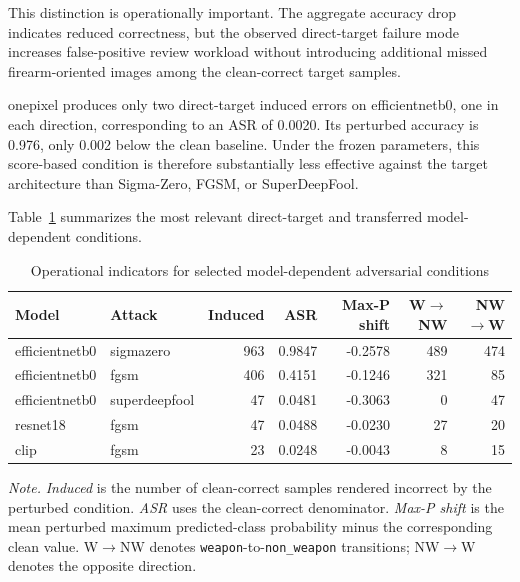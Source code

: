 This distinction is operationally important. The aggregate accuracy drop
indicates reduced correctness, but the observed direct-target failure mode
increases false-positive review workload without introducing additional missed
firearm-oriented images among the clean-correct target samples.

\gls{onepixel} produces only two direct-target induced errors on
\gls{efficientnetb0}, one in each direction, corresponding to an ASR of 0.0020.
Its perturbed accuracy is 0.976, only 0.002 below the clean baseline. Under the
frozen parameters, this score-based condition is therefore substantially less
effective against the target architecture than Sigma-Zero, FGSM, or
SuperDeepFool.

Table~\ref{tab:results-adversarial-operational-errors} summarizes the most
relevant direct-target and transferred model-dependent conditions.

\begin{table}[H]
\centering
\scriptsize
\setlength{\tabcolsep}{3.5pt}
\renewcommand{\arraystretch}{1.15}
\caption{Operational indicators for selected model-dependent adversarial
conditions}
\label{tab:results-adversarial-operational-errors}
\begin{tabular}{@{}l l r r r r r@{}}
\toprule
\textbf{Model} &
\textbf{Attack} &
\textbf{Induced} &
\textbf{ASR} &
\textbf{Max-P shift} &
\textbf{W\(\rightarrow\)NW} &
\textbf{NW\(\rightarrow\)W} \\
\midrule

\gls{efficientnetb0}
& \gls{sigmazero}
& 963
& 0.9847
& -0.2578
& 489
& 474 \\

\gls{efficientnetb0}
& \gls{fgsm}
& 406
& 0.4151
& -0.1246
& 321
& 85 \\

\gls{efficientnetb0}
& \gls{superdeepfool}
& 47
& 0.0481
& -0.3063
& 0
& 47 \\

\gls{resnet18}
& \gls{fgsm}
& 47
& 0.0488
& -0.0230
& 27
& 20 \\

\acrshort{clip}
& \gls{fgsm}
& 23
& 0.0248
& -0.0043
& 8
& 15 \\

\bottomrule
\end{tabular}

\vspace{0.4em}
\footnotesize
\textit{Note.} \textit{Induced} is the number of clean-correct samples rendered
incorrect by the perturbed condition. \textit{ASR} uses the clean-correct
denominator. \textit{Max-P shift} is the mean perturbed maximum
predicted-class probability minus the corresponding clean value.
W\(\rightarrow\)NW denotes \texttt{weapon}-to-\texttt{non\_weapon}
transitions; NW\(\rightarrow\)W denotes the opposite direction.
\end{table}

